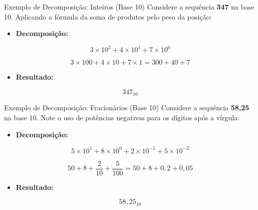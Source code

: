 \begin{frame}{Exemplo de Decomposição: Inteiros (Base 10)}
    Considere a sequência \textbf{347} na base 10. Aplicando a fórmula da soma de produtos pelo peso da posição:

    \begin{itemize}
        \item \textbf{Decomposição:}
    \end{itemize}

    $$ 3 \times 10^2 + 4 \times 10^1 + 7 \times 10^0 $$


    $$ 3 \times 100 + 4 \times 10 + 7 \times 1 = 300 + 40 + 7 $$

    \begin{itemize}
        \item \textbf{Resultado:}
    \end{itemize}

    $$ 347_{10} $$


\end{frame}

\begin{frame}{Exemplo de Decomposição: Fracionários (Base 10)}
    Considere a sequência \textbf{58,25} na base 10. Note o uso de potências negativas para os dígitos após a vírgula:

    \begin{itemize}
        \item \textbf{Decomposição:}
    \end{itemize}

    $$ 5 \times 10^1 + 8 \times 10^0 + 2 \times 10^{-1} + 5 \times 10^{-2} $$



    $$ 50 + 8 + \frac{2}{10} + \frac{5}{100} = 50 + 8 + 0,2 + 0,05 $$

    \begin{itemize}
        \item \textbf{Resultado:}
    \end{itemize}

    $$ 58,25_{10} $$
\end{frame}

